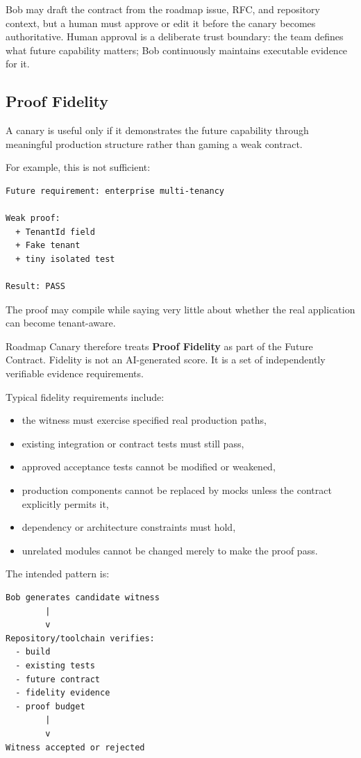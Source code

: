 \documentclass[12pt]{article}
\begin{document}
Bob may draft the contract from the roadmap issue, RFC, and repository context, but a human must approve or edit it before the canary becomes authoritative. Human approval is a deliberate trust boundary: the team defines what future capability matters; Bob continuously maintains executable evidence for it.

\subsection{Proof Fidelity}

A canary is useful only if it demonstrates the future capability through meaningful production structure rather than gaming a weak contract.

For example, this is not sufficient:

\begin{lstlisting}
Future requirement: enterprise multi-tenancy

Weak proof:
  + TenantId field
  + Fake tenant
  + tiny isolated test

Result: PASS
\end{lstlisting}

The proof may compile while saying very little about whether the real application can become tenant-aware.

Roadmap Canary therefore treats \textbf{Proof Fidelity} as part of the Future Contract. Fidelity is not an AI-generated score. It is a set of independently verifiable evidence requirements.

Typical fidelity requirements include:

\begin{itemize}
    \item the witness must exercise specified real production paths,
    \item existing integration or contract tests must still pass,
    \item approved acceptance tests cannot be modified or weakened,
    \item production components cannot be replaced by mocks unless the contract explicitly permits it,
    \item dependency or architecture constraints must hold,
    \item unrelated modules cannot be changed merely to make the proof pass.
\end{itemize}

The intended pattern is:

\begin{lstlisting}
Bob generates candidate witness
        |
        v
Repository/toolchain verifies:
  - build
  - existing tests
  - future contract
  - fidelity evidence
  - proof budget
        |
        v
Witness accepted or rejected
\end{lstlisting}
\end{document}
